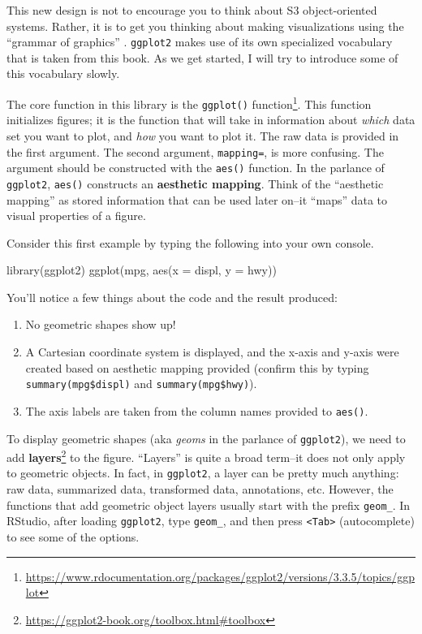 \documentclass[
  12pt,
  krantz2]{krantz}
\makeatletter
\newenvironment{Shaded}{\begin{snugshade}}{\end{snugshade}}
\newcommand{\AttributeTok}[1]{\textcolor[rgb]{0.61,0.61,0.61}{#1}}
\newcommand{\FunctionTok}[1]{\textcolor[rgb]{0,0,0}{#1}}
\newcommand{\NormalTok}[1]{#1}
\renewcommand{\href}[2]{#2\footnote{\url{#1}}}
\newenvironment{kframe}{%
\medskip{}
\setlength{\fboxsep}{.8em}
 \def\at@end@of@kframe{}%
 \ifinner\ifhmode%
  \def\at@end@of@kframe{\end{minipage}}%
  \begin{minipage}{\columnwidth}%
 \fi\fi%
 \def\FrameCommand##1{\hskip\@totalleftmargin \hskip-\fboxsep
 \colorbox{shadecolor}{##1}\hskip-\fboxsep
     \hskip-\linewidth \hskip-\@totalleftmargin \hskip\columnwidth}%
 \MakeFramed {\advance\hsize-\width
   \@totalleftmargin\z@ \linewidth\hsize
   \@setminipage}}%
 {\par\unskip\endMakeFramed%
 \at@end@of@kframe}
\renewenvironment{Shaded}{\begin{kframe}}{\end{kframe}}
\makeatother
\begin{document}
This new design is not to encourage you to think about S3 object-oriented systems. Rather, it is to get you thinking about making visualizations using the ``grammar of graphics'' \citep{gog}. \texttt{ggplot2} makes use of its own specialized vocabulary that is taken from this book. As we get started, I will try to introduce some of this vocabulary slowly.

The core function in this library is the \href{https://www.rdocumentation.org/packages/ggplot2/versions/3.3.5/topics/ggplot}{\texttt{ggplot()} function}. This function initializes figures; it is the function that will take in information about \emph{which} data set you want to plot, and \emph{how} you want to plot it. The raw data is provided in the first argument. The second argument, \texttt{mapping=}, is more confusing. The argument should be constructed with the \texttt{aes()} function. In the parlance of \texttt{ggplot2}, \texttt{aes()} constructs an \textbf{aesthetic mapping}. Think of the ``aesthetic mapping'' as stored information that can be used later on--it ``maps'' data to visual properties of a figure.

Consider this first example by typing the following into your own console.

\begin{Shaded}
\begin{Highlighting}[]
\FunctionTok{library}\NormalTok{(ggplot2)}
\FunctionTok{ggplot}\NormalTok{(mpg, }\FunctionTok{aes}\NormalTok{(}\AttributeTok{x =}\NormalTok{ displ, }\AttributeTok{y =}\NormalTok{ hwy))}
\end{Highlighting}
\end{Shaded}

You'll notice a few things about the code and the result produced:

\begin{enumerate}
\def\labelenumi{\arabic{enumi}.}
\item
  No geometric shapes show up!
\item
  A Cartesian coordinate system is displayed, and the x-axis and y-axis were created based on aesthetic mapping provided (confirm this by typing \texttt{summary(mpg\$displ)} and \texttt{summary(mpg\$hwy)}).
\item
  The axis labels are taken from the column names provided to \texttt{aes()}.
\end{enumerate}

To display geometric shapes (aka \emph{geoms} in the parlance of \texttt{ggplot2}), we need to add \href{https://ggplot2-book.org/toolbox.html\#toolbox}{\textbf{layers}} to the figure. ``Layers'' is quite a broad term--it does not only apply to geometric objects. In fact, in \texttt{ggplot2}, a layer can be pretty much anything: raw data, summarized data, transformed data, annotations, etc. However, the functions that add geometric object layers usually start with the prefix \texttt{geom\_}. In RStudio, after loading \texttt{ggplot2}, type \texttt{geom\_}, and then press \texttt{\textless{}Tab\textgreater{}} (autocomplete) to see some of the options.
\end{document}
